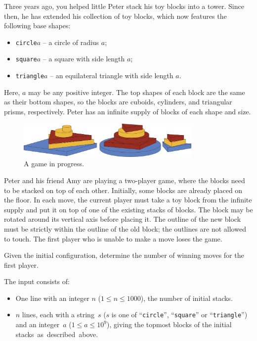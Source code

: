 
\newcommand{\playerA}{Peter}
\newcommand{\playerB}{Amy}

Three years ago, you helped little \playerA{} stack his toy blocks into a tower.
Since then, he has extended his collection of toy blocks, which now features the following base shapes:
\begin{itemize}
  \item \texttt{circle}\;$a$ -- a circle of radius $a$;
  \item \texttt{square}\;$a$ -- a square with side length $a$;
  \item \texttt{triangle}\;$a$ -- an equilateral triangle with side length $a$.
\end{itemize}
Here, $a$ may be any positive integer.
The top shapes of each block are the same as their bottom shapes,
so the blocks are cuboids, cylinders, and triangular prisms, respectively.
\playerA{} has an infinite supply of blocks of each shape and size.

\begin{figure}[h]
	\centering
	\includegraphics[width=0.8\textwidth]{image}
	\caption{A game in progress.}
\end{figure}

\playerA{} and his friend \playerB{} are playing a two-player game, where the blocks need to be stacked on top of each other.
Initially, some blocks are already placed on the floor.
In each move, the current player must take a toy block from the infinite supply and put it on top of one of the existing stacks of blocks.
The block may be rotated around its vertical axis before placing it.
The outline of the new block must be strictly within the outline of the old block; the outlines are not allowed to touch.
The first player who is unable to make a move loses the game.

Given the initial configuration, determine the number of winning moves for the first player.

\vspace{-3mm}
\begin{Input}
  The input consists of:
  \begin{itemize}
    \item One line with an integer $n$ ($1 \le n \le 1000$), the number of initial stacks.
    \item $n$ lines, each with a string~$s$ ($s$ is one of ``\texttt{circle}'', ``\texttt{square}'' or ``\texttt{triangle}'') and an integer~$a$ ($1 \le a \le 10^9$), giving the topmost blocks of the initial stacks~as~described~above.
  \end{itemize}
\end{Input}

